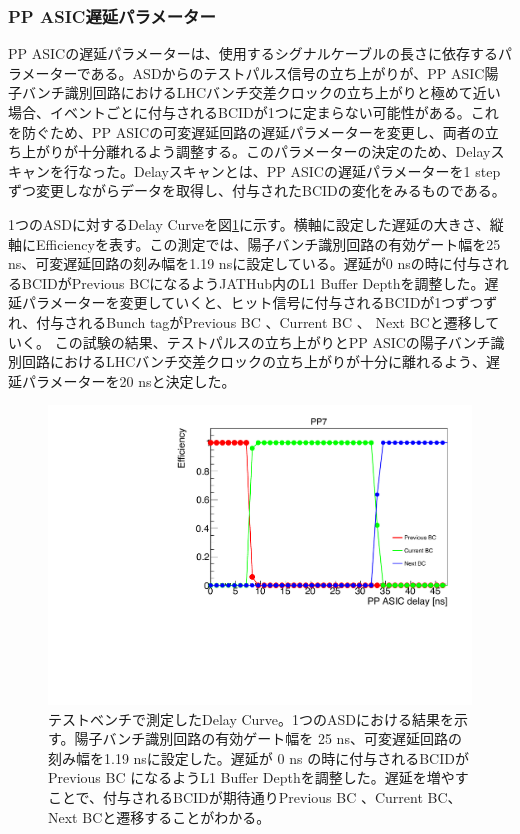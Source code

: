 \subsubsection{PP ASIC遅延パラメーター}
\baselineskip
PP ASICの遅延パラメーターは、使用するシグナルケーブルの長さに依存するパラメーターである。ASDからのテストパルス信号の立ち上がりが、PP ASIC陽子バンチ識別回路におけるLHCバンチ交差クロックの立ち上がりと極めて近い場合、イベントごとに付与されるBCIDが1つに定まらない可能性がある。これを防ぐため、PP ASICの可変遅延回路の遅延パラメーターを変更し、両者の立ち上がりが十分離れるよう調整する。このパラメーターの決定のため、Delayスキャンを行なった。Delayスキャンとは、PP ASICの遅延パラメーターを1 stepずつ変更しながらデータを取得し、付与されたBCIDの変化をみるものである。

1つのASDに対するDelay Curveを図\ref{QAQCdelayscan}に示す。横軸に設定した遅延の大きさ、縦軸にEfficiencyを表す。この測定では、陽子バンチ識別回路の有効ゲート幅を25 ns、可変遅延回路の刻み幅を1.19 nsに設定している。遅延が0 nsの時に付与されるBCIDがPrevious BCになるようJATHub内のL1 Buffer Depthを調整した。遅延パラメーターを変更していくと、ヒット信号に付与されるBCIDが1つずつずれ、付与されるBunch tagがPrevious BC 、Current BC 、 Next BCと遷移していく。
この試験の結果、テストパルスの立ち上がりとPP ASICの陽子バンチ識別回路におけるLHCバンチ交差クロックの立ち上がりが十分に離れるよう、遅延パラメーターを20 nsと決定した。
\begin{figure} 
\centering
\includegraphics[width=16cm]{fig/QAQC/QAQCdelayscan.pdf}
\caption[ディレイカーブ]{テストベンチで測定したDelay Curve。1つのASDにおける結果を示す。陽子バンチ識別回路の有効ゲート幅を 25 ns、可変遅延回路の刻み幅を1.19 nsに設定した。遅延が 0 ns の時に付与されるBCIDがPrevious BC になるようL1 Buffer Depthを調整した。遅延を増やすことで、付与されるBCIDが期待通りPrevious BC 、Current BC、Next BCと遷移することがわかる。}
\label{QAQCdelayscan}
\end{figure}

